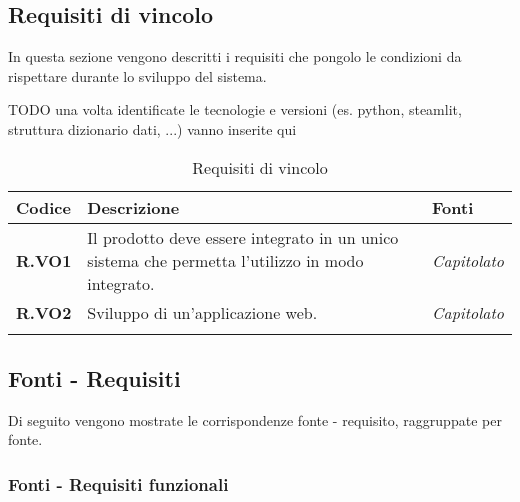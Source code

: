 \subsection{Requisiti di vincolo}
In questa sezione vengono descritti i requisiti che pongolo le condizioni da rispettare durante lo sviluppo del sistema.

TODO una volta identificate le tecnologie e versioni (es. python, steamlit, struttura dizionario dati, ...) vanno inserite qui
\begin{longtable}{|P{3cm}|P{6,5cm}|>{\arraybackslash}P{4cm}|}
  \hline
  \textbf{Codice} & \textbf{Descrizione} & \textbf{Fonti} \\
  \hline
  \textbf{R.VO1} & Il prodotto deve essere integrato in un unico sistema che permetta l'utilizzo in modo integrato. & \emph{Capitolato} \\
  \hline
  \textbf{R.VO2} & Sviluppo di un'applicazione web. & \emph{Capitolato} \\
  \hline
\caption{Requisiti di vincolo}
\label{requisitivincolo}
\end{longtable}

\subsection{Fonti - Requisiti}
Di seguito vengono mostrate le corrispondenze fonte - requisito, raggruppate per fonte.

\subsubsection{Fonti - Requisiti funzionali}

